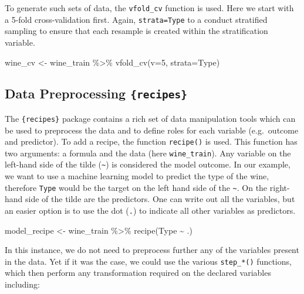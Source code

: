 \documentclass[
]{krantz}
\makeatletter
\newenvironment{Shaded}{\begin{snugshade}}{\end{snugshade}}
\newcommand{\AttributeTok}[1]{\textcolor[rgb]{0.61,0.61,0.61}{#1}}
\newcommand{\DecValTok}[1]{\textcolor[rgb]{0.06,0.06,0.06}{#1}}
\newcommand{\FunctionTok}[1]{\textcolor[rgb]{0,0,0}{#1}}
\newcommand{\NormalTok}[1]{#1}
\newcommand{\OtherTok}[1]{\textcolor[rgb]{0.37,0.37,0.37}{#1}}
\newcommand{\SpecialCharTok}[1]{\textcolor[rgb]{0,0,0}{#1}}
\newenvironment{kframe}{%
\medskip{}
\setlength{\fboxsep}{.8em}
 \def\at@end@of@kframe{}%
 \ifinner\ifhmode%
  \def\at@end@of@kframe{\end{minipage}}%
  \begin{minipage}{\columnwidth}%
 \fi\fi%
 \def\FrameCommand##1{\hskip\@totalleftmargin \hskip-\fboxsep
 \colorbox{shadecolor}{##1}\hskip-\fboxsep
     \hskip-\linewidth \hskip-\@totalleftmargin \hskip\columnwidth}%
 \MakeFramed {\advance\hsize-\width
   \@totalleftmargin\z@ \linewidth\hsize
   \@setminipage}}%
 {\par\unskip\endMakeFramed%
 \at@end@of@kframe}
\renewenvironment{Shaded}{\begin{kframe}}{\end{kframe}}
\makeatother
\begin{document}
To generate such sets of data, the \texttt{vfold\_cv} function is used. Here we start with a 5-fold cross-validation first. Again, \texttt{strata=Type} to a conduct stratified sampling to ensure that each resample is created within the stratification variable.

\begin{Shaded}
\begin{Highlighting}[]
\NormalTok{wine\_cv }\OtherTok{\textless{}{-}}\NormalTok{ wine\_train }\SpecialCharTok{\%\textgreater{}\%} 
  \FunctionTok{vfold\_cv}\NormalTok{(}\AttributeTok{v=}\DecValTok{5}\NormalTok{, }\AttributeTok{strata=}\NormalTok{Type)}
\end{Highlighting}
\end{Shaded}

\hypertarget{data-preprocessing-recipes}{%
\subsection{\texorpdfstring{Data Preprocessing \texttt{\{recipes\}}}{Data Preprocessing \{recipes\}}}\label{data-preprocessing-recipes}}

The \texttt{\{recipes\}} package contains a rich set of data manipulation tools which can be used to preprocess the data and to define roles for each variable (e.g.~outcome and predictor). To add a recipe, the function \texttt{recipe()} is used. This function has two arguments: a formula and the data (here \texttt{wine\_train}). Any variable on the left-hand side of the tilde (\texttt{\textasciitilde{}}) is considered the model outcome. In our example, we want to use a machine learning model to predict the type of the wine, therefore \texttt{Type} would be the target on the left hand side of the \texttt{\textasciitilde{}}. On the right-hand side of the tilde are the predictors. One can write out all the variables, but an easier option is to use the dot (\texttt{.}) to indicate all other variables as predictors.

\begin{Shaded}
\begin{Highlighting}[]
\NormalTok{model\_recipe }\OtherTok{\textless{}{-}}\NormalTok{ wine\_train }\SpecialCharTok{\%\textgreater{}\%} 
  \FunctionTok{recipe}\NormalTok{(Type }\SpecialCharTok{\textasciitilde{}}\NormalTok{ .)}
\end{Highlighting}
\end{Shaded}

In this instance, we do not need to preprocess further any of the variables present in the data. Yet if it was the case, we could use the various \texttt{step\_*()} functions, which then perform any transformation required on the declared variables including:
\end{document}
